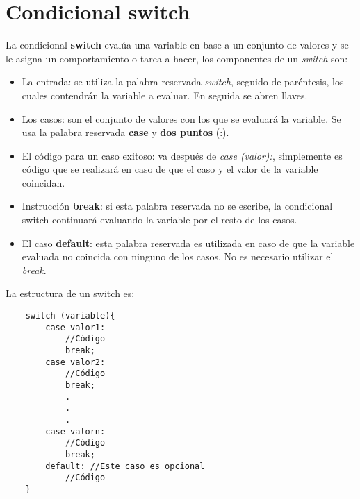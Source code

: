 \section{Condicional switch}
La condicional \textbf{switch} evalúa una variable en base a un conjunto de valores y se le asigna un comportamiento o tarea a hacer, los componentes de un \textit{switch} son:
\begin{itemize}
    \item La entrada: se utiliza la palabra reservada \textit{switch}, seguido de paréntesis, los cuales contendrán la variable a evaluar. En seguida se abren llaves.
    \item Los casos: son el conjunto de valores con los que se evaluará la variable. Se usa la palabra reservada \textbf{case} y \textbf{dos puntos} (:).
    \item El código para un caso exitoso: va después de \textit{case (valor):}, simplemente es código que se realizará en caso de que el caso y el valor de la variable coincidan.
    \item Instrucción \textbf{break}: si esta palabra reservada no se escribe, la condicional switch continuará evaluando la variable por el resto de los casos.
    \item El caso \textbf{default}: esta palabra reservada es utilizada en caso de que la variable evaluada no coincida con ninguno de los casos. No es necesario utilizar el \textit{break}.
\end{itemize}
La estructura de un switch es:
\begin{lstlisting}
    switch (variable){
        case valor1:
            //Código
            break;
        case valor2:
            //Código
            break;
            .
            .
            .
        case valorn:
            //Código
            break;
        default: //Este caso es opcional
            //Código
    }
\end{lstlisting}

